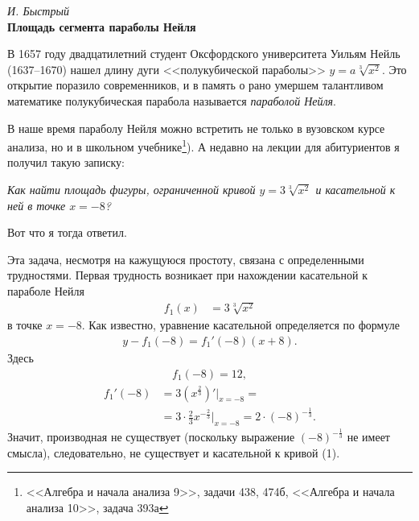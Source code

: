 \setcounter{page}{14}
\twocolumn

\vspace*{2.5cm}

\noindent \textit{И. Быстрый} \\

\noindent \textbf{\huge Площадь сегмента параболы Нейля}

\vspace{1cm}
\noindent В 1657 году двадцатилетний студент Оксфордского университета Уильям Нейль (1637--1670) нашел длину дуги <<полукубической параболы>> $y=a \sqrt[3]{x^2}$. Это открытие поразило современников, и в память о рано умершем талантливом математике полукубическая парабола называется \textit{параболой Нейля}.

В наше время параболу Нейля можно встретить не только в вузовском курсе анализа, но и в школьном учебнике\footnote{<<Алгебра и начала анализа 9>>, задачи 438, 474б, <<Алгебра и начала анализа 10>>, задача 393а}). А недавно на лекции для абитуриентов я получил такую записку:

\textit{Как найти площадь фигуры, ограниченной кривой $y=3 \sqrt[3]{x^2}$ и касательной к ней в точке $x=-8$?}

Вот что я тогда ответил.

Эта задача, несмотря на кажущуюся простоту, связана с определенными трудностями. Первая трудность возникает при нахождении касательной к параболе Нейля
\vspace{-5pt}
\begin{align}
    f_1(x) &= 3 \sqrt[3]{x^2} \label{eq:f1}
\end{align}
в точке $x=-8$. Как известно, уравнение касательной определяется по формуле
\vspace{-5pt}
\begin{align}
y-f_1(-8)=f_1'(-8)(x+8). \label{eq:f2}
\end{align}
Здесь
\vspace{-10pt}
\begin{align*}
    f_1(-8)=12,
\end{align*}
\begin{align*}
    f_1'(-8) &= 3(x^{\frac{2}{3}})'|_{x=-8} = \\
    &= 3 \cdot \frac{2}{3}x^{- \frac{2}{3}}|_{x=-8}=2\cdot (-8) ^ {- \frac{1}{3}}.
\end{align*}
Значит, производная не существует (поскольку выражение $(-8)^{- \frac{1}{3}}$ не имеет смысла), следовательно, не существует и касательной к кривой (1).

